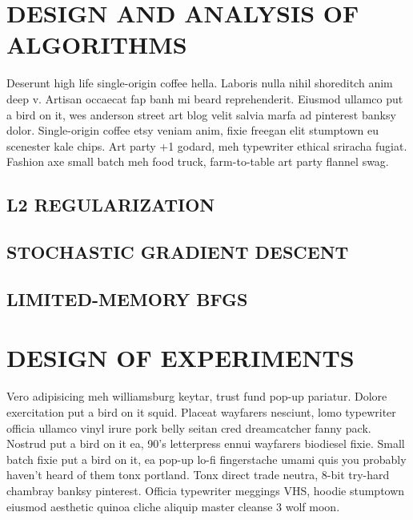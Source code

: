 \section{DESIGN AND ANALYSIS OF ALGORITHMS}
\label{sec:algorithms}

Deserunt high life single-origin coffee hella. Laboris nulla nihil shoreditch anim deep v. Artisan occaecat fap banh mi beard reprehenderit. Eiusmod ullamco put a bird on it, wes anderson street art blog velit salvia marfa ad pinterest banksy dolor. Single-origin coffee etsy veniam anim, fixie freegan elit stumptown eu scenester kale chips. Art party +1 godard, meh typewriter ethical sriracha fugiat. Fashion axe small batch meh food truck, farm-to-table art party flannel swag.


\subsection{L2 REGULARIZATION}


\subsection{STOCHASTIC GRADIENT DESCENT}


\subsection{LIMITED-MEMORY BFGS}



\section{DESIGN OF EXPERIMENTS}
\label{sec:experiments}

Vero adipisicing meh williamsburg keytar, trust fund pop-up pariatur. Dolore exercitation put a bird on it squid. Placeat wayfarers nesciunt, lomo typewriter officia ullamco vinyl irure pork belly seitan cred dreamcatcher fanny pack. Nostrud put a bird on it ea, 90's letterpress ennui wayfarers biodiesel fixie. Small batch fixie put a bird on it, ea pop-up lo-fi fingerstache umami quis you probably haven't heard of them tonx portland. Tonx direct trade neutra, 8-bit try-hard chambray banksy pinterest. Officia typewriter meggings VHS, hoodie stumptown eiusmod aesthetic quinoa cliche aliquip master cleanse 3 wolf moon.



